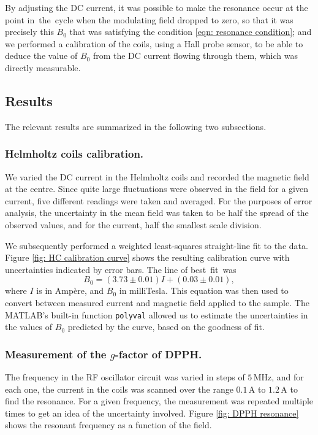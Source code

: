 \documentclass[a4paper]{jpconf}
\numberwithin{equation}{section}
\begin{document}
By adjusting the DC current, it was possible to make the resonance occur at the point in~the~cycle when the modulating field dropped to zero, so that it was precisely this $B_0$ that was satisfying the condition \eqref{eqn: resonance condition}; and we performed a calibration of the coils, using a Hall probe sensor, to be able to deduce the value of $B_0$ from the DC current flowing through them, which was directly measurable. 

\subsection{Results}
The relevant results are summarized in the following two subsections.

\subsubsection{Helmholtz coils calibration.} \label{section: calibration}
We varied the DC current in the Helmholtz coils and recorded the magnetic field at the centre. Since quite large fluctuations were observed in the field for a given current, five different readings were taken and averaged. For the purposes of error analysis, the uncertainty in the mean field was taken to be half the spread of the observed values, and for the current, half the smallest scale division. 

We subsequently performed a weighted least-squares straight-line fit to the data. Figure \ref{fig: HC calibration curve} shows the resulting calibration curve with uncertainties indicated by error bars. The line of best~fit~was 
\[
B_0 = (3.73 \pm 0.01) I + (0.03 \pm 0.01),
\]
where $I$ is in Amp\`ere, and $B_0$ in milliTesla. This equation was then used to convert between measured current and magnetic field applied to the sample. The MATLAB's built-in function \texttt{polyval} allowed us to estimate the uncertainties in the values of $B_0$ predicted by the curve, based on the goodness of fit.


\subsubsection{Measurement of the $g$-factor of DPPH.}
The frequency in the RF oscillator circuit was varied in steps of $5 \, \si{\mega\hertz}$, and for each one, the current in the coils was scanned over the range $0.1 \, \si{\ampere}$ to $1.2 \, \si{\ampere}$ to find the resonance. For a given frequency, the measurement was repeated multiple times to get an idea of the uncertainty involved. Figure \ref{fig: DPPH resonance} shows the resonant frequency as a function of the field.
\end{document}
